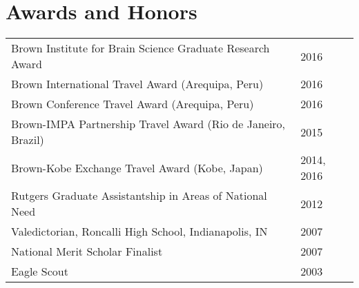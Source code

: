 \section*{Awards and Honors}
\begin{longtabu} to \textwidth {X[4.6,l]  X[.8,r]} 
Brown Institute for Brain Science Graduate Research Award
    & 2016 \\
Brown International Travel Award (Arequipa, Peru)
    & 2016 \\
Brown Conference Travel Award (Arequipa, Peru)
    & 2016 \\
Brown-IMPA Partnership Travel Award (Rio de Janeiro, Brazil)
    & 2015 \\
Brown-Kobe Exchange Travel Award (Kobe, Japan)
    & 2014, 2016 \\
Rutgers Graduate Assistantship in Areas of National Need
    & 2012 \\
Valedictorian, Roncalli High School, Indianapolis, IN
    & 2007 \\
National Merit Scholar Finalist
    & 2007 \\
Eagle Scout
    & 2003 \\
\end{longtabu}

\nocite{Bur12a,Bur12b,Bur16,Bra18b}





